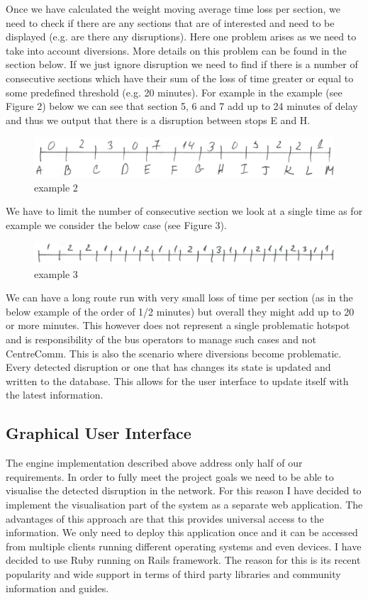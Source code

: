 Once we have calculated the weight moving average time loss per section, we need to check if there are any sections that are of interested and need to be displayed (e.g. are there any disruptions). Here one problem arises as we need to take into account diversions. More details on this problem can be found in the section below. If we just ignore disruption we need to find if there is a number of consecutive sections which have their sum of the loss of time greater or equal to some predefined threshold (e.g. 20 minutes). For example in the example (see Figure 2) below we can see that section 5, 6 and 7 add up to 24 minutes of delay and thus we output that there is a disruption between stops E and H. 
\begin{figure}[ht!]
\includegraphics[scale=0.2]{Figures/figure2.jpg}
\caption{example 2 \label{overflow}}
\end{figure}
We have to limit the number of consecutive section we look at a single time as for example we consider the below case (see Figure 3). 
\begin{figure}[ht!]
\includegraphics[scale=0.2]{Figures/figure3.jpg}
\caption{example 3 \label{overflow}}
\end{figure}
We can have a long route run with very small loss of time per section (as in the below example of the order of 1/2 minutes) but overall they might add up to 20 or more minutes. This however does not represent a single problematic hotspot and is responsibility of the bus operators to manage such cases and not CentreComm. This is also the scenario where diversions become problematic. Every detected disruption  or one that has changes its state is updated and written to the database. This allows for the user interface to update itself with the latest information.

\subsection{Graphical User Interface}
The engine implementation described above address only half of our requirements. In order to fully meet the project goals we need to be able to visualise the detected disruption in the network. For this reason I have decided to implement the visualisation part of the system as a separate web application. The advantages of this approach are that this provides universal access to the information. We only need to deploy this application once and it can be accessed from multiple clients running different operating systems and even devices. I have decided to use Ruby running on Rails framework. The reason for this is its recent popularity and wide support in terms of third party libraries and community information and guides.

